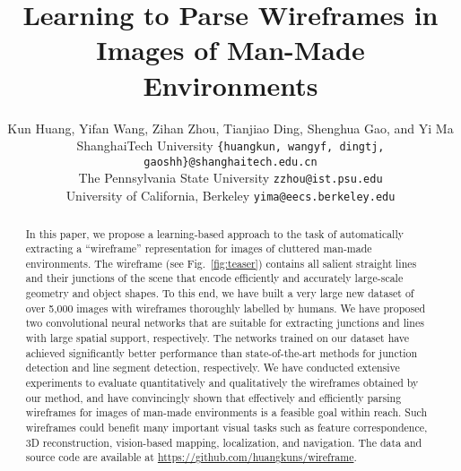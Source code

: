 \documentclass[10pt,twocolumn,letterpaper]{article}
\begin{document}
\title{Learning to Parse Wireframes in Images of Man-Made Environments \vspace{-4mm}}

\author{Kun Huang, Yifan Wang, Zihan Zhou, Tianjiao Ding, Shenghua Gao, and Yi Ma\\
ShanghaiTech University {\tt\small \{huangkun, wangyf, dingtj, gaoshh\}@shanghaitech.edu.cn}\\
The Pennsylvania State University {\tt\small zzhou@ist.psu.edu}\\
University of California, Berkeley {\tt\small yima@eecs.berkeley.edu}
}


\maketitle


\begin{abstract}
In this paper, we propose a learning-based approach to the task of automatically extracting a ``wireframe'' representation
for images of cluttered man-made environments. The wireframe (see Fig.~\ref{fig:teaser}) contains all salient straight lines
and their junctions of the scene that encode efficiently and accurately large-scale geometry and object shapes. To this end, we have built
a very large new dataset of over 5,000 images with wireframes thoroughly labelled by humans. We have proposed two convolutional neural networks
that are suitable for extracting junctions and lines with large spatial support, respectively. The networks trained on our dataset
have achieved significantly better performance than state-of-the-art methods for junction detection and line segment
detection, respectively. We have conducted extensive experiments to evaluate quantitatively and qualitatively the wireframes
obtained by our method, and have convincingly shown that effectively and efficiently parsing wireframes for images of
man-made environments is a feasible goal within reach. Such wireframes could benefit many important visual tasks such as
feature correspondence, 3D reconstruction, vision-based mapping, localization, and navigation. The data and source code are available at \url{https://github.com/huangkuns/wireframe}.
\end{abstract}
\end{document}
